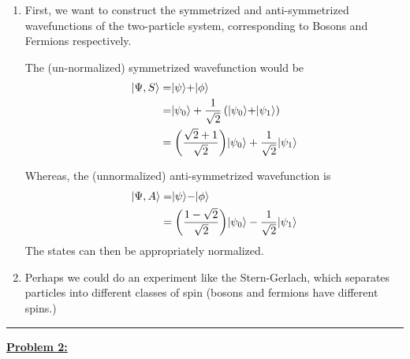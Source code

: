 \documentclass[twoside]{article}
\begin{document}
\begin{enumerate}
   \item First, we want to construct the symmetrized and anti-symmetrized wavefunctions of the two-particle system, corresponding to Bosons and Fermions respectively.
   
   The (un-normalized) symmetrized wavefunction would be 
   \begin{align*}
      \rvert\Psi, S\rangle &= \rvert\psi\rangle + \rvert\phi\rangle \\
      &= \rvert\psi_0\rangle + \frac{1}{\sqrt{2}}\left( \rvert\psi_0\rangle + \rvert\psi_1\rangle \right) \\
      &= \left(\frac{\sqrt{2} + 1}{\sqrt{2}}\right) \rvert\psi_0\rangle + \frac{1}{\sqrt{2}}\rvert\psi_1\rangle
   \end{align*}

   Whereas, the (unnormalized) anti-symmetrized wavefunction is 
   \begin{align*}
      \rvert\Psi, A\rangle &= \rvert\psi\rangle - \rvert\phi\rangle \\
      &= \left( \frac{1-\sqrt{2}}{\sqrt{2}} \right) \rvert\psi_0\rangle - \frac{1}{\sqrt{2}} \rvert\psi_1\rangle
   \end{align*}
   The states can then be appropriately normalized.

   \vskip 1cm
   \item Perhaps we could do an experiment like the Stern-Gerlach, which separates particles into different classes of spin (bosons and fermions have different spins.)
\end{enumerate}

\vskip 0.5cm
\hrule
\vskip 0.5cm


\underline{\textbf{Problem 2:}}
\end{document}
